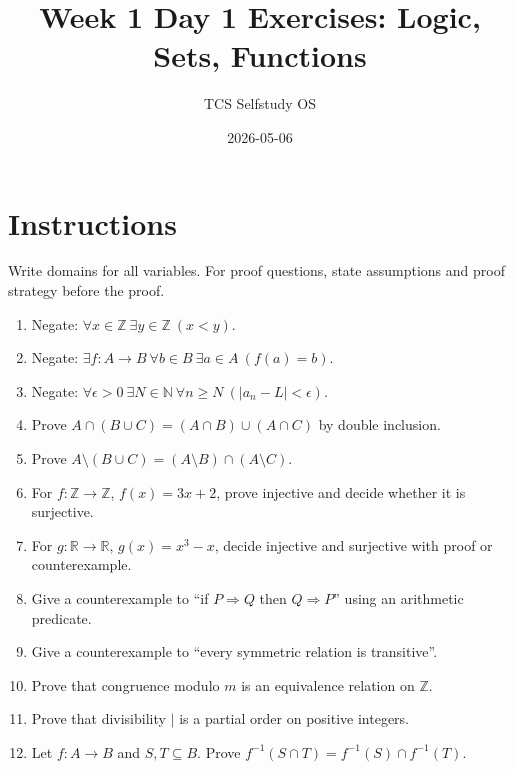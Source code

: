 \documentclass[11pt]{article}
\title{Week 1 Day 1 Exercises: Logic, Sets, Functions}
\author{TCS Selfstudy OS}
\date{2026-05-06}
\begin{document}
\maketitle

\section*{Instructions}
Write domains for all variables. For proof questions, state assumptions and proof strategy before the proof.

\begin{enumerate}[label=\textbf{D1.\arabic*.}]
\item Negate: $\forall x\in\mathbb{Z}\ \exists y\in\mathbb{Z}\ (x<y)$.
\item Negate: $\exists f:A\to B\ \forall b\in B\ \exists a\in A\ (f(a)=b)$.
\item Negate: $\forall \epsilon>0\ \exists N\in\mathbb{N}\ \forall n\ge N\ (|a_n-L|<\epsilon)$.
\item Prove $A\cap(B\cup C)=(A\cap B)\cup(A\cap C)$ by double inclusion.
\item Prove $A\setminus(B\cup C)=(A\setminus B)\cap(A\setminus C)$.
\item For $f:\mathbb{Z}\to\mathbb{Z}$, $f(x)=3x+2$, prove injective and decide whether it is surjective.
\item For $g:\mathbb{R}\to\mathbb{R}$, $g(x)=x^3-x$, decide injective and surjective with proof or counterexample.
\item Give a counterexample to ``if $P\Rightarrow Q$ then $Q\Rightarrow P$'' using an arithmetic predicate.
\item Give a counterexample to ``every symmetric relation is transitive''.
\item Prove that congruence modulo $m$ is an equivalence relation on $\mathbb{Z}$.
\item Prove that divisibility $\mid$ is a partial order on positive integers.
\item Let $f:A\to B$ and $S,T\subseteq B$. Prove $f^{-1}(S\cap T)=f^{-1}(S)\cap f^{-1}(T)$.
\end{enumerate}
\end{document}
